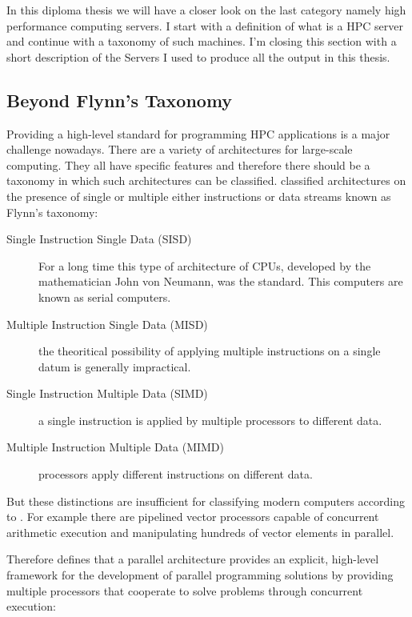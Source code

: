 In this diploma thesis we will have a closer look on the last category
namely high performance computing servers. I start with a definition
of what is a HPC server and continue with a taxonomy of such
machines. I'm closing this section with a short description of the
Servers I used to produce all the output in this thesis.

\subsection{Beyond Flynn's Taxonomy}

Providing a high-level standard for programming HPC applications is a
major challenge nowadays. There are a variety of architectures for
large-scale computing. They all have specific features and 
therefore there should be a taxonomy in which such architectures can
be classified. \cite{flynn72sco} classified architectures on the
presence of single or multiple either instructions or data streams
known as Flynn's taxonomy:
\begin{description}
\item[Single Instruction Single Data (SISD)]
  For a long time this type of architecture of CPUs, developed by the
  mathematician John von Neumann, was the standard. This computers are
  known as serial computers. 
\item[Multiple Instruction Single Data (MISD)] the theoritical possibility
  of applying multiple instructions on a single datum is generally
  impractical.
\item[Single Instruction Multiple Data (SIMD)] 
  a single instruction is applied by multiple processors to different
  data.
\item[Multiple Instruction Multiple Data (MIMD)] processors apply
  different instructions on different data. 
\end{description}

But these distinctions are insufficient for classifying modern
computers according to \cite{duncan90survey}. For example there are
pipelined vector processors capable of concurrent arithmetic execution and
manipulating hundreds of vector elements in parallel.

Therefore \cite{duncan90survey} defines that a parallel architecture
provides an explicit, high-level framework for 
the development of parallel programming solutions by providing
multiple processors that cooperate to solve problems through
concurrent execution:

